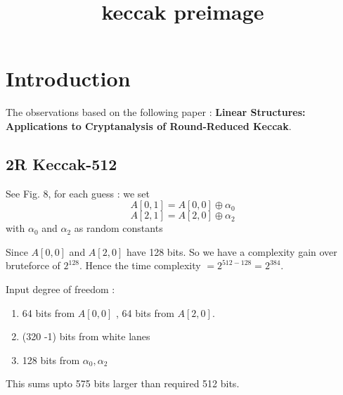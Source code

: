 \documentclass{article}
\title{keccak preimage}
\begin{document}
\maketitle

\section{Introduction}

The observations based on the following paper : \textbf{Linear Structures: Applications to Cryptanalysis of Round-Reduced Keccak}.

\subsection{2R Keccak-512}

See Fig. 8, for each guess :
we set 
\[
    A[0, 1] = A[0, 0] \oplus \alpha_{0}
\]
\[
    A[2, 1] = A[2, 0] \oplus \alpha_{2}
\]
with $\alpha_0$ and $\alpha_2$ as random constants

Since $A[0,0]$ and $A[2,0]$ have 128 bits. So we have a complexity gain over bruteforce of $2^{128}$. Hence the time complexity $= 2^{512 - 128} = 2^{384}$.

Input degree of freedom : 
\begin{enumerate}
    \item 64 bits from $A[0, 0]$ , 64 bits from $A[2,0]$.
    \item (320 -1) bits from white lanes
    \item 128 bits from $\alpha_0, \alpha_2$
\end{enumerate}

This sums upto 575 bits larger than required 512 bits.
\end{document}
